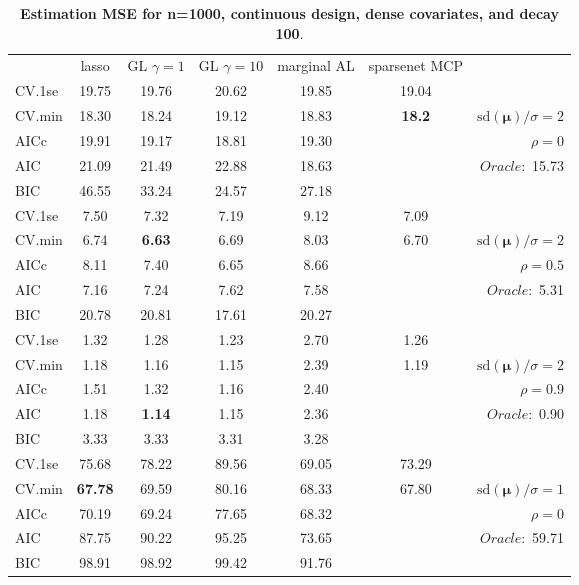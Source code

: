 \begin{table}\vspace{-.5cm}
\caption[l]{ { \bf Estimation MSE for n=1000, continuous design, 
dense covariates, and  decay  100}.}
\vspace{-.5cm}
\footnotesize{}
\begin{center}
\begin{tabular}{l*{5}{c}|r}
& lasso & GL $\gamma=1$ & GL $\gamma=10$ & marginal AL & sparsenet MCP  & \\
 \cline{1-7}
CV.1se & 19.75 & 19.76 & 20.62 & 19.85 & 19.04 & \\
CV.min & 18.30 & 18.24 & 19.12 & 18.83 & {\bf 18.2} &  $\mathrm{sd}(\mathbf{\mu})/\sigma=2$ \\
AICc & 19.91 & 19.17 & 18.81 & 19.30 & & $\rho=0$ \\
AIC & 21.09 & 21.49 & 22.88 & 18.63 & &  \multirow{2}{*}{$Oracle: $ 15.73} \\
BIC & 46.55 & 33.24 & 24.57 & 27.18 & &  \\
 \hline 
CV.1se & 7.50 & 7.32 & 7.19 & 9.12 & 7.09 & \\
CV.min & 6.74 & {\bf 6.63} & 6.69 & 8.03 & 6.70 &  $\mathrm{sd}(\mathbf{\mu})/\sigma=2$ \\
AICc & 8.11 & 7.40 & 6.65 & 8.66 & & $\rho=0.5$ \\
AIC & 7.16 & 7.24 & 7.62 & 7.58 & &  \multirow{2}{*}{$Oracle: $ 5.31} \\
BIC & 20.78 & 20.81 & 17.61 & 20.27 & &  \\
 \hline 
CV.1se & 1.32 & 1.28 & 1.23 & 2.70 & 1.26 & \\
CV.min & 1.18 & 1.16 & 1.15 & 2.39 & 1.19 &  $\mathrm{sd}(\mathbf{\mu})/\sigma=2$ \\
AICc & 1.51 & 1.32 & 1.16 & 2.40 & & $\rho=0.9$ \\
AIC & 1.18 & {\bf 1.14} & 1.15 & 2.36 & &  \multirow{2}{*}{$Oracle: $ 0.90} \\
BIC & 3.33 & 3.33 & 3.31 & 3.28 & &  \\
 \hline 
CV.1se & 75.68 & 78.22 & 89.56 & 69.05 & 73.29 & \\
CV.min & {\bf 67.78} & 69.59 & 80.16 & 68.33 & 67.80 &  $\mathrm{sd}(\mathbf{\mu})/\sigma=1$ \\
AICc & 70.19 & 69.24 & 77.65 & 68.32 & & $\rho=0$ \\
AIC & 87.75 & 90.22 & 95.25 & 73.65 & &  \multirow{2}{*}{$Oracle: $ 59.71} \\
BIC & 98.91 & 98.92 & 99.42 & 91.76 & &  \\

\end{tabular}
\end{center}
\end{table}
